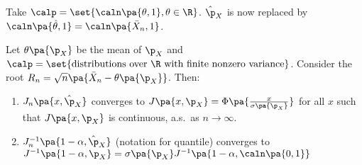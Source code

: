 \begin{example}
Take $ \calp = \set{\caln \pa{\theta,1}, \theta\in \R}$. $\hat{\p}_X$ is now replaced by $\caln \pa{\hat{\theta},1} = \caln \pa{\bar{X}_n, 1}$.
\end{example}

\begin{theorem}\label{thm:bootstrap}
  Let $\theta\pa{\p_X}$ be the mean of $\p_X$ and $\calp = \set{\text{distributions over }\R \text{ with finite nonzero variance}}$. Consider the root $R_n = \sqrt{n}\pa{\bar{X}_n- \theta\pa{\p_X}}$. Then:
  \renewcommand{\labelenumi}{\roman{enumi})}
  \begin{enumerate}
    \item $J_n\pa{x,\hat{\p}_X}$ converges to $J\pa{x,\p_X} = \Phi \pa{\frac{x}{\sigma\pa{\p_X}}}$ for all $x$ such that $J\pa{x,\p_X}$ is continuous, a.s.~as $n\rightarrow \infty$.
    \item $J_n^{-1}\pa{1-\alpha,\hat{\p}_X}$ (notation for quantile) converges to $J^{-1}\pa{1-\alpha,\p_X} = \sigma\pa{\p_X}J^{-1}\pa{1-\alpha, \caln\pa{0,1}}$
  \end{enumerate}
\end{theorem}
